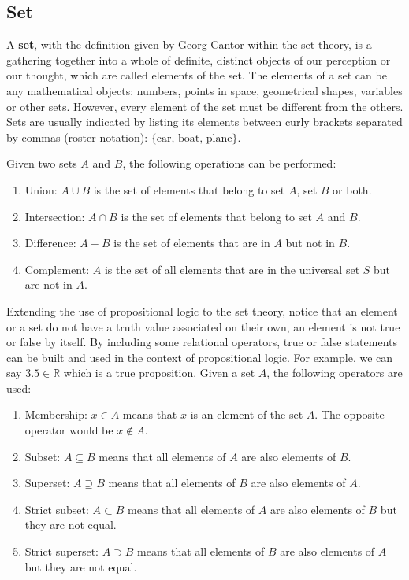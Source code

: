         \subsection*{Set}

A \textbf{set}, with the definition given by Georg Cantor within the set theory, 
is a gathering together into a whole of definite, distinct objects of our perception or our thought, 
which are called elements of the set.
The elements of a set can be any mathematical objects: numbers, points in space, geometrical shapes, variables or other sets.
However, every element of the set must be different from the others.
Sets are usually indicated by listing its elements between curly brackets separated by commas (roster notation): $\{\textrm{car, boat, plane}\}$.

Given two sets $A$ and $B$, the following operations can be performed:
\begin{enumerate}[noitemsep]
    \item Union: $A\cup B$ is the set of elements that belong to set $A$, set $B$ or both.
    \item Intersection: $A\cap B$ is the set of elements that belong to set $A$ and $B$.
    \item Difference: $A - B$ is the set of elements that are in $A$ but not in $B$.
    \item Complement: $\overline{A}$ is the set of all elements that are in the universal set $S$ but are not in $A$.
\end{enumerate}
Extending the use of propositional logic to the set theory, notice that an element or a set 
do not have a truth value associated on their own, an element is not true or false by itself. 
By including some relational operators, true or false statements can be 
built and used in the context of propositional logic. 
For example, we can say $3.5 \in \mathbb{R}$ which is a true proposition. 
Given a set $A$, the following operators are used:
\begin{enumerate}[noitemsep]
    \item Membership: $x\in A$ means that $x$ is an element of the set $A$. The opposite operator would be $x\notin A$.
    \item Subset: $A \subseteq B$ means that all elements of $A$ are also elements of $B$.
    \item Superset: $A \supseteq B$ means that all elements of $B$ are also elements of $A$.
    \item Strict subset: $A \subset B$ means that all elements of $A$ are also elements of $B$ but they are not equal.
    \item Strict superset: $A \supset B$ means that all elements of $B$ are also elements of $A$ but they are not equal.
\end{enumerate}



